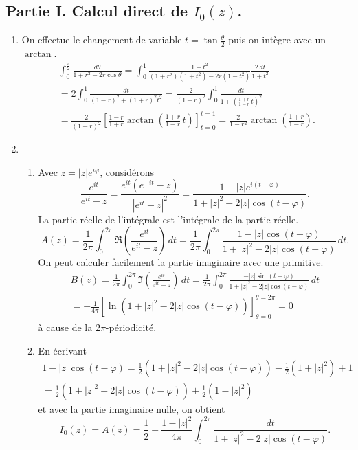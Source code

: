 \subsection*{Partie I. Calcul direct de $I_0(z)$.}
\begin{enumerate}
 \item On effectue le changement de variable $t = \tan \frac{\theta}{2}$ puis on intègre avec un $\arctan$.
\begin{multline*}
\int_0^{\frac{\pi}{2}}\frac{d\theta}{1+r^2 - 2r\cos \theta}
 = \int_{0}^{1}\frac{1+t^2}{(1+r^2)(1+t^2)-2r(1-t^2)}\frac{2\,dt}{1+t^2} \\
 = 2\int_0^1\frac{dt}{(1-r)^2 +(1+r)^2t^2}
 = \frac{2}{(1-r)^2}\int_0^1\frac{dt}{1+\left( \frac{1+r}{1-r}\, t\right)^2 }\\
 = \frac{2}{(1-r)^2} \left[ \frac{1-r}{1+r} \arctan \left( \frac{1+r}{1-r}\, t\right) \right]_{t=0}^{t=1} 
 = \frac{2}{1-r^2} \arctan \left( \frac{1+r}{1-r}\right).
\end{multline*}

 \item
\begin{enumerate}
 \item Avec $z=|z|e^{i\varphi}$, considérons 
\[
 \frac{e^{it}}{e^{it} - z} = \frac{e^{it}(e^{-it} - \overline{z})}{\left| e^{it} - z\right|^2}
 = \frac{1-|z|e^{i(t-\varphi)}}{1 + |z|^2 - 2|z|\cos(t-\varphi)}.
\]
La partie réelle de l'intégrale est l'intégrale de la partie réelle. 
\[
 A(z) = \frac{1}{2\pi}\int_0^{2\pi}\Re\left( \frac{e^{it}}{e^{it} - z}\right) \,dt
 = \frac{1}{2\pi}\int_0^{2\pi}\frac{1-|z|\cos(t-\varphi)}{1 + |z|^2 - 2|z|\cos(t-\varphi)} \,dt.
\]
On peut calculer facilement la partie imaginaire avec une primitive.
\begin{multline*}
 B(z) = \frac{1}{2\pi}\int_0^{2\pi}\Im\left( \frac{e^{it}}{e^{it} - z}\right) \,dt
 = \frac{1}{2\pi}\int_0^{2\pi}\frac{-|z|\sin(t-\varphi)}{1 + |z|^2 - 2|z|\cos(t-\varphi)} \,dt \\
 = -\frac{1}{4\pi} \left[ \ln\left( 1 + |z|^2 - 2|z|\cos(t-\varphi)\right) \right]_{\theta = 0}^{\theta = 2\pi} = 0
\end{multline*}
à cause de la $2\pi$-périodicité.

 \item En écrivant 
\begin{multline*}
 1-|z|\cos(t-\varphi) = \frac{1}{2}\left( 1 + |z|^2 - 2|z|\cos(t-\varphi)\right) - \frac{1}{2}\left( 1 + |z|^2\right) + 1\\
 = \frac{1}{2}\left( 1 + |z|^2 - 2|z|\cos(t-\varphi)\right) + \frac{1}{2}\left( 1 - |z|^2\right)
\end{multline*}
et avec la partie imaginaire nulle, on obtient
\[
 I_0(z) = A(z) = \frac{1}{2}+ \frac{1 - |z|^2}{4\pi}\int_{0}^{2\pi}\frac{dt}{1 + |z|^2 - 2|z|\cos(t-\varphi)}.
\]
\end{enumerate}


\end{enumerate}
